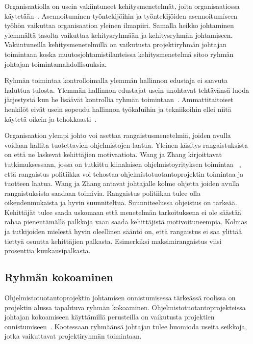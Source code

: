 \documentclass[finnish]{tktltiki2}
\theoremstyle{definition}
\theoremstyle{remark}
\begin{document}
Organisaatiolla on usein vakiintuneet kehitysmenetelmät, joita organisaatiossa käytetään~\cite{McLeod:2011:FAS:1978802.1978803}. Asennoituminen työntekijöihin ja työntekijöiden asennoitumiseen työhön vaikuttaa organisaation yleinen ilmapiiri. Samalla heikko johtaminen ylemmältä tasolta vaikuttaa kehitysryhmään ja kehitysryhmän johtamiseen. Vakiintuneilla kehitysmenetelmillä on vaikutusta projektiryhmän johtajan toimintaan koska muutosjohtamistilanteissa kehitysmenetelmä sitoo ryhmän johtajan toimintamahdollisuuksia.

Ryhmän toimintaa kontrolloimalla ylemmän hallinnon edustaja ei saavuta haluttua tulosta. Ylemmän hallinnon edustajat usein unohtavat tehtävänsä luoda järjestystä kun he lisäävät kontrollia ryhmän toimintaan~\cite{Augustine:2005:APM:1101779.1101781}. Ammattitaitoiset henkilöt eivät usein sopeudu hallinnon työkaluihin ja tekniikoihin ellei niitä käytetä oikein ja tehokkaasti~\cite{Augustine:2005:APM:1101779.1101781}.

Organisaation ylempi johto voi asettaa rangaistusmenetelmiä, joiden avulla voidaan hallita tuotettavien ohjelmistojen laatua. Yleinen käsitys rangaistuksista on että ne laskevat kehittäjien motivaatiota. Wang ja Zhang kirjoittavat tutkimuksessaan, jossa on tutkittu kiinalaisen ohjelmistoyrityksen toimintaa ~\cite{Wang:2010:PPP:1810295.1810302}, että rangaistus politiikka voi tehostaa ohjelmistotuotantoprojektin toimintaa ja tuotteen laatua. Wang ja Zhang antavat johtajalle kolme ohjetta joiden avulla rangaistuksista saadaan toimivia. Rangaistus politiikan tulee olla oikeudenmukaista ja hyvin suunniteltua. Suunniteelussa ohjeistus on tärkeää. Kehittäjät tulee saada uskomaan että menetelmän tarkoituksena ei ole säästää rahaa pienentämällä palkkoja vaan saada kehittäjistä motivoituneempia. Kolmas ja tutkijoiden mielestä hyvin oleellinen sääntö on, että rangaistus ei saa ylittää tiettyä osuutta kehittäjien palkasta. Esimerkiksi maksimirangaistus viisi prosenttia kuukausipalkasta.



\subsection{Ryhmän kokoaminen}


Ohjelmistotuotantoprojektin johtamisen onnistumisessa tärkeässä roolissa on projektin alussa tapahtuva ryhmän kokoaminen. Ohjelmistotuotantoprojekteissa johtajan kokoamiseen käyttämillä perusteilla on vaikutusta projektien onnistumiseen~\cite{daSilva2012}. Kootessaan ryhmäänsä johtajan tulee huomioda useita seikkoja, jotka vaikuttavat projektiryhmän toimintaan.  
\end{document}
